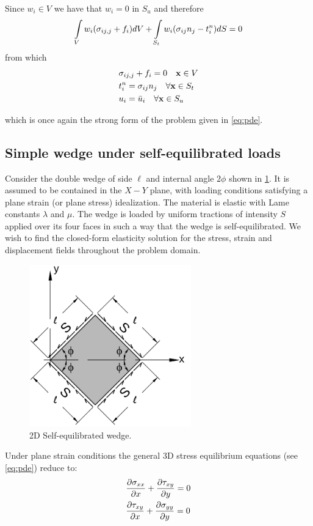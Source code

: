 Since ${w_i} \in V$ we have that ${w_i}=0$ in $S_u$ and therefore
\[\int\limits_V w_i(\sigma_{ij,j} + f_i)dV + \int\limits_{S_t} w_i( \sigma_{ij} n_j - t_i^n )dS = 0 \]
from which
\begin{equation} \label{equil_2}
\begin{split}
&\sigma_{ij,j} + f_i = 0 \quad \vb{x} \in V \\
&t_i^n = \sigma_{ij} n_j \quad \forall \vb{x} \in S_t\\
&{u_i} = \bar{u}_i \quad \forall \vb{x} \in S_u
\end{split}
\end{equation}

which is once again the strong form of the problem given in \cref{eq:pde}.

\subsection*{Simple wedge under self-equilibrated loads}
Consider the double wedge of side $\ell$ and internal angle $2 \phi$ shown in \cref{fig:WEDGE}. It is assumed to be contained in the $X-Y$ plane, with loading conditions satisfying a plane strain (or plane stress) idealization. The material is elastic with Lame constants $\lambda$ and $\mu$. The wedge is loaded by uniform tractions of intensity $S$ applied over its four faces in such a way that the wedge is self-equilibrated. We wish to find the closed-form elasticity solution for the stress, strain and displacement fields throughout the problem domain.
%
\begin{figure}[H]
\centering
\includegraphics[width=7cm]{img_src/wedge.pdf}
\caption{2D Self-equilibrated wedge.}
\label{fig:WEDGE}
\end{figure}

Under plane strain conditions the general 3D stress equilibrium equations (see \cref{eq:pde}) reduce to:
\begin{equation}
\begin{aligned}
&\pdv{\sigma_{xx}}{x}+\pdv{\tau_{xy}}{y}=0\\
&\pdv{\tau_{xy}}{x}+\pdv{\sigma_{yy}}{y}=0
\end{aligned}
\label{eq:equilibrium}
\end{equation}

